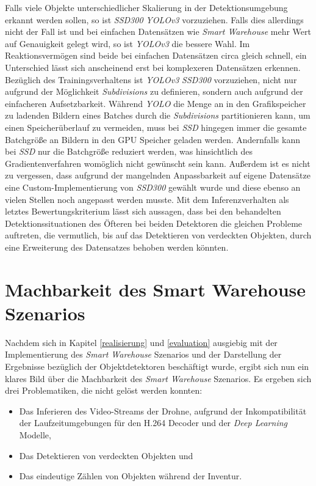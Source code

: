 Falls viele Objekte unterschiedlicher Skalierung in der Detektionsumgebung erkannt werden sollen, so ist \textit{SSD300} \textit{YOLOv3} vorzuziehen. Falls dies allerdings nicht der Fall ist und bei einfachen Datensätzen wie \textit{Smart Warehouse} mehr Wert auf Genauigkeit gelegt wird, so ist \textit{YOLOv3} die bessere Wahl. Im Reaktionsvermögen sind beide bei einfachen Datensätzen circa gleich schnell, ein Unterschied lässt sich anscheinend erst bei komplexeren Datensätzen erkennen. Bezüglich des Trainingsverhaltens ist \textit{YOLOv3} \textit{SSD300} vorzuziehen, nicht nur aufgrund der Möglichkeit \textit{Subdivisions} zu definieren, sondern auch aufgrund der einfacheren Aufsetzbarkeit. Während \textit{YOLO} die Menge an in den Grafikspeicher zu ladenden Bildern eines Batches durch die \textit{Subdivisions} partitionieren kann, um einen Speicherüberlauf zu vermeiden, muss bei \textit{SSD} hingegen immer die gesamte Batchgröße an Bildern in den GPU Speicher geladen werden. Andernfalls kann bei \textit{SSD} nur die Batchgröße reduziert werden, was hinsichtlich des Gradientenverfahren womöglich nicht gewünscht sein kann. Außerdem ist es nicht zu vergessen, dass aufgrund der mangelnden Anpassbarkeit auf eigene Datensätze eine Custom-Implementierung von \textit{SSD300} gewählt wurde und diese ebenso an vielen Stellen noch angepasst werden musste. Mit dem Inferenzverhalten als letztes Bewertungskriterium lässt sich aussagen, dass bei den behandelten Detektionssituationen des Öfteren bei beiden Detektoren die gleichen Probleme auftreten, die vermutlich, bis auf das Detektieren von verdeckten Objekten, durch eine Erweiterung des Datensatzes behoben werden könnten.

\section{Machbarkeit des Smart Warehouse Szenarios}

Nachdem sich in Kapitel \ref{realisierung} und \ref{evaluation} ausgiebig mit der Implementierung des \textit{Smart Warehouse} Szenarios und der Darstellung der Ergebnisse bezüglich der Objektdetektoren beschäftigt wurde, ergibt sich nun ein klares Bild über die Machbarkeit des \textit{Smart Warehouse} Szenarios. Es ergeben sich drei Problematiken, die nicht gelöst werden konnten: 

\begin{itemize}
	\item Das Inferieren des Video-Streams der Drohne, aufgrund der Inkompatibilität der Laufzeitumgebungen für den H.264 Decoder und der \textit{Deep Learning} Modelle,
	\item Das Detektieren von verdeckten Objekten und
	\item Das eindeutige Zählen von Objekten während der Inventur.
\end{itemize}

